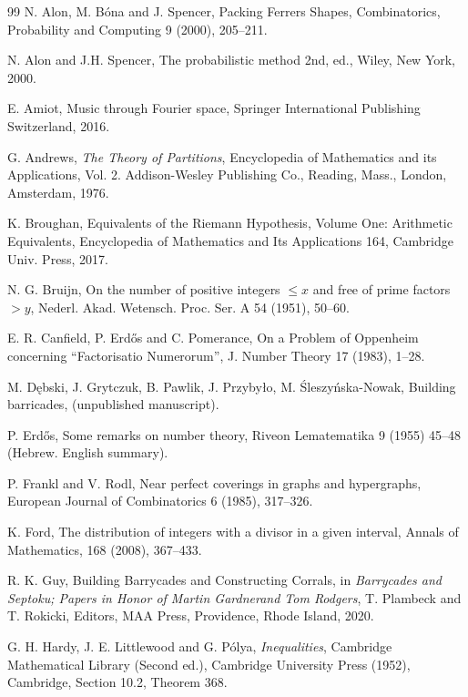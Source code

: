 \documentclass[12pt]{amsart}
\theoremstyle{plain}
\numberwithin{equation}{section}
\begin{document}
\begin{thebibliography}{99}
	 N. Alon, M. B\'{o}na and J. Spencer, Packing Ferrers Shapes, 	Combinatorics, Probability and Computing 9 (2000), 205--211.
	
	 N. Alon and J.H. Spencer, The probabilistic method 2nd, ed., Wiley, New York, 2000.
	
	 E. Amiot, Music through Fourier space, Springer International Publishing Switzerland, 2016.
	
	 G. Andrews, {\em The Theory of Partitions}, Encyclopedia of Mathematics and its Applications, Vol. 2. Addison-Wesley Publishing Co., Reading, Mass., London, Amsterdam, 1976.
	
	 K. Broughan, Equivalents of the Riemann Hypothesis, Volume One: Arithmetic Equivalents, Encyclopedia of Mathematics and Its Applications 164, Cambridge Univ. Press, 2017. 
	
	 N. G. Bruijn, On the number of positive integers $\leqslant x$ and free of prime 
	factors $>y$, Nederl. Akad. Wetensch. Proc. Ser. A 54 (1951), 50--60.
	
	 E. R. Canfield, P. Erd\H{o}s and C. Pomerance, On a Problem of Oppenheim concerning ``Factorisatio Numerorum'',	J. Number Theory 17 (1983), 1--28.
	
	 M. D\k{e}bski, J. Grytczuk, B. Pawlik, J. Przyby\l o, M. \'{S}leszy\'{n}ska-Nowak, Building barricades, (unpublished manuscript).
	
	 P. Erd\H{o}s, Some remarks on number theory, Riveon Lematematika 9 (1955) 45--48 (Hebrew. English summary).

P. Frankl and V. Rodl, Near perfect coverings in graphs and hypergraphs, 
European Journal of Combinatorics 6 (1985), 317--326.
	
	 K. Ford,  The distribution of integers with a divisor in a given interval, Annals of Mathematics, 168 (2008), 367--433.
	
	 R. K. Guy, Building Barrycades and Constructing Corrals, in \emph{Barrycades and Septoku; Papers in Honor of Martin Gardnerand Tom Rodgers}, T. Plambeck and T. Rokicki, Editors, MAA Press, Providence, Rhode Island, 2020.
	
	 G. H. Hardy, J. E. Littlewood and G. P\'{o}lya, {\em Inequalities}, Cambridge Mathematical Library (Second ed.), Cambridge University Press (1952), Cambridge,
	Section 10.2, Theorem 368.
	

\end{thebibliography}
\end{document}
